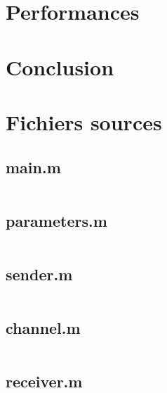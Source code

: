 \documentclass[10pt, oneside, a4paper]{article}
\begin{document}
\section{Performances}


\section{Conclusion}

\appendix
\newpage

\section{Fichiers sources}
\label{sec:fichiers-sources}

\subsection{main.m}
\inputminted{matlab}{../main.m}
\label{app:main}

\subsection{parameters.m}
\inputminted{matlab}{../parameters.m}
\label{app:paremeters}

\subsection{sender.m}
\inputminted{matlab}{../sender.m}
\label{app:sender}

\subsection{channel.m}
\inputminted{matlab}{../channel.m}
\label{app:channel}

\subsection{receiver.m}
\inputminted{matlab}{../receiver.m}
\label{app:receiver}
\end{document}

